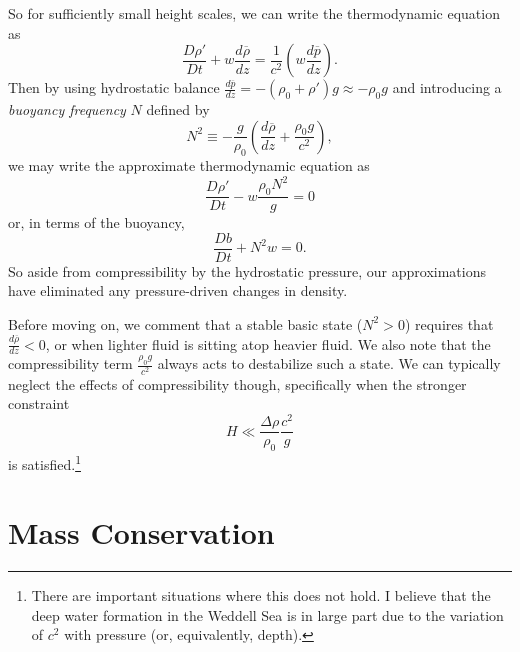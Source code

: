 \documentclass[letterpaper, 11pt]{article}
\begin{document}
So for sufficiently small height scales, we can write the thermodynamic equation as
\begin{equation}
\frac{D \rho'}{D t} + w \frac{d \overline{\rho}}{d z} = \frac{1}{c^2} \left(w \frac{d \overline{p}}{d z}\right).
\end{equation}
Then by using hydrostatic balance $\frac{d \overline{p}}{d z} = -\left(\rho_0 + \rho'\right) g \approx -\rho_0 g$ and introducing a \textit{buoyancy frequency} $N$ defined by
\begin{equation}
N^2 \equiv -\frac{g}{\rho_0} \left( \frac{d \overline{\rho}}{d z} + \frac{\rho_0 g}{c^2} \right),
\end{equation}
we may write the approximate thermodynamic equation as
\begin{equation}\label{ApproxThermoEqn}
\frac{D \rho'}{D t} - w \frac{\rho_0 N^2}{g} = 0
\end{equation} 
or, in terms of the buoyancy,
\begin{equation}
\frac{D b}{D t} + N^2 w = 0.
\end{equation}
So aside from compressibility by the hydrostatic pressure, our approximations have eliminated any pressure-driven changes in density.

Before moving on, we comment that a stable basic state ($N^2 > 0$) requires that $\frac{d \overline{\rho}}{d z} < 0$, or when lighter fluid is sitting atop heavier fluid. We also note that the compressibility term $\frac{\rho_0 g}{c^2}$ always acts to destabilize such a state. We can typically neglect the effects of compressibility though, specifically when the stronger constraint
\begin{equation*}
H \ll \frac{\Delta \rho}{\rho_0} \frac{c^2}{g}
\end{equation*}
is satisfied.\footnote{There are important situations where this does not hold. I believe that the deep water formation in the Weddell Sea is in large part due to the variation of $c^2$ with pressure (or, equivalently, depth).}


\section{Mass Conservation}
\end{document}
